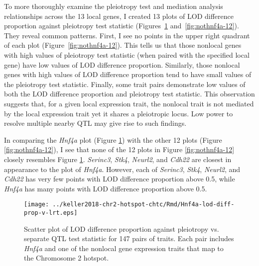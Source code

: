 \documentclass[oneside]{book}\usepackage[]{graphicx}\usepackage[]{color}
\begin{document}
\begin{titlepage}

To more thoroughly examine the pleiotropy test and mediation analysis
relationships across the 13 local genes,
I created 13 plots of LOD difference proportion against pleiotropy test
statistic (Figures~\ref{fig:hnf4a} and~\ref{fig:nothnf4a-12}).
They reveal common patterns.
First, I see no points in the upper right quadrant of each plot (Figure~\ref{fig:nothnf4a-12}).
This tells us that those nonlocal genes with high values of pleiotropy test statistic
(when paired with the specified local gene) have low values of LOD difference proportion.
Similarly, those nonlocal genes with high values of LOD difference proportion tend
to have small values of the pleiotropy test statistic.
Finally, some trait pairs demonstrate low values of both
the LOD difference proportion and pleiotropy test statistic.
This observation suggests that, for a given local expression trait, the nonlocal trait
is not mediated by the local expression trait yet it shares a pleiotropic locus.
Low power to resolve multiple nearby QTL may give rise to such findings.

In comparing the \emph{Hnf4a} plot (Figure \ref{fig:hnf4a}) with the other
12 plots (Figure \ref{fig:nothnf4a-12}),
I see that none of the 12 plots in Figure \ref{fig:nothnf4a-12} closely resembles Figure \ref{fig:hnf4a}.
\emph{Serinc3}, \emph{Stk4}, \emph{Neurl2}, and \emph{Cdh22} are closest in appearance to the plot of \emph{Hnf4a}.
However, each of \emph{Serinc3}, \emph{Stk4}, \emph{Neurl2}, and \emph{Cdh22}
has very few points with LOD difference proportion above 0.5,
while \emph{Hnf4a} has many points with LOD difference proportion above 0.5.

\begin{figure}
    \centering
    \texttt{[image: ../keller2018-chr2-hotspot-chtc/Rmd/Hnf4a-lod-diff-prop-v-lrt.eps]}
    \caption[LOD difference proportion vs. pleiotropy test statistic.]{Scatter plot of LOD difference proportion against pleiotropy vs.
    separate QTL test statistic for 147 pairs of traits.
    Each pair includes \emph{Hnf4a} and one of the nonlocal gene expression traits that map to the Chromosome 2 hotspot.}
    \label{fig:hnf4a}
\end{figure}


\end{titlepage}
\end{document}
